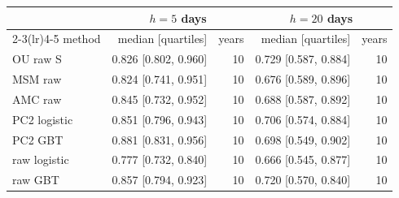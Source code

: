 \begin{tabular}{lrrrr}\toprule
 & \multicolumn{2}{c}{$h=5$ days} & \multicolumn{2}{c}{$h=20$ days}\\
\cmidrule(lr){2-3}\cmidrule(lr){4-5} method & median [quartiles] & years & median [quartiles] & years\\\midrule
OU raw S & 0.826 [0.802, 0.960] & 10 & 0.729 [0.587, 0.884] & 10\\
MSM raw & 0.824 [0.741, 0.951] & 10 & 0.676 [0.589, 0.896] & 10\\
AMC raw & 0.845 [0.732, 0.952] & 10 & 0.688 [0.587, 0.892] & 10\\
PC2 logistic & 0.851 [0.796, 0.943] & 10 & 0.706 [0.574, 0.884] & 10\\
PC2 GBT & 0.881 [0.831, 0.956] & 10 & 0.698 [0.549, 0.902] & 10\\
raw logistic & 0.777 [0.732, 0.840] & 10 & 0.666 [0.545, 0.877] & 10\\
raw GBT & 0.857 [0.794, 0.923] & 10 & 0.720 [0.570, 0.840] & 10\\
\bottomrule\end{tabular}
